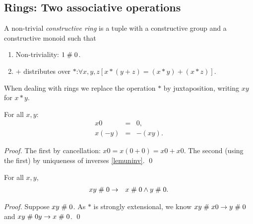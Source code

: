 
\subsection{Rings: Two associative operations}

\begin{definition}\label{defring}
A non-trivial
{\em constructive ring\/} is a tuple 
with  a
constructive group and  a
constructive monoid such that 
\begin{enumerate}
\item Non-triviality: $1\mathrel{\#} 0$.
\item $+$ distributes over $*$:\quad $\forall x,y,z[x*(y+z) = (x*y)+(x*z)]$.
\end{enumerate}
\end{definition}

\begin{notation}
When dealing with rings we replace the operation $*$ by juxtaposition,
writing $xy$ for $x*y$.
\end{notation}


\begin{lemma}\label{lemring}For all $x, y$:
  \begin{eqnarray*}
    x   0 &=& 0,\\
    x   (- y) &=& -(x y).
  \end{eqnarray*}
\end{lemma}

\begin{proof}
The first by cancellation: $x0=x(0+0)=x0+x0$. The second (using the
first) by uniqueness of inverses \ref{lemuninv}. \qed
\end{proof}

\begin{lemma}\label{lemHeyt}
For all $x,y$,
\begin{eqnarray*}
x  y \mathrel{\#} 0 &\rightarrow& x\mathrel{\#} 0 \wedge y\mathrel{\#} 0.
\end{eqnarray*}
\end{lemma}
\begin{proof}
Suppose $x y \mathrel{\#} 0$. As $*$ is strongly extensional, we know 
$x y \mathrel{\#} x 0\rightarrow y\mathrel{\#} 0$ and $x y \mathrel{\#} 0 y \rightarrow x\mathrel{\#} 0$.
\qed
\end{proof}


